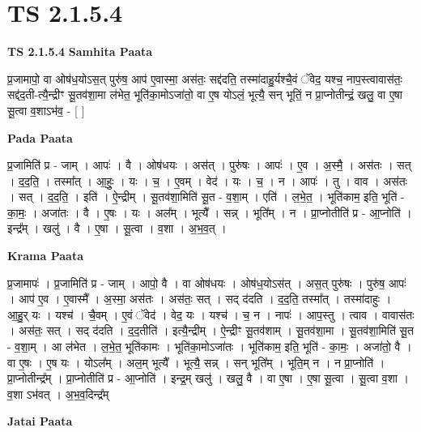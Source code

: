 \documentclass[17pt]{extarticle}
\begin{document}
\section{ TS 2.1.5.4 }

\textbf{TS 2.1.5.4 } \newline
\textbf{Samhita Paata} \newline

प्र॒जामापो॒ वा ओष॑ध॒योऽस॒त् पुरु॑ष॒ आप॑ ए॒वास्मा॒ अस॑तः॒ सद्द॑दति॒ तस्मा॑दाहु॒र्यश्चै॒वं ॅवेद॒ यश्च॒ नाप॒स्त्वावास॑तः॒ सद्द॑द॒ती-त्यै॒न्द्रीꣳ सू॒तव॑शा॒मा ल॑भेत॒ भूति॑का॒मोऽजा॑तो॒ वा ए॒ष योऽलं॒ भूत्यै॒ सन् भूतिं॒ न प्रा॒प्नोतीन्द्रं॒ खलु॒ वा ए॒षा सू॒त्वा व॒शाऽभ॑व॒ - [  ] \newline

\textbf{Pada Paata} \newline

प्र॒जामिति॑ प्र - जाम् । आपः॑ । वै । ओष॑धयः । अस॑त् । पुरु॑षः । आपः॑ । ए॒व । अ॒स्मै॒ । अस॑तः । सत् । द॒द॒ति॒ । तस्मा᳚त् । आ॒हुः॒ । यः । च॒ । ए॒वम् । वेद॑ । यः । च॒ । न । आपः॑ । तु । वाव । अस॑तः । सत् । द॒द॒ति॒ । इति॑ । ऐ॒न्द्रीम् । सू॒तव॑शा॒मिति॑ सू॒त - व॒शा॒म् । एति॑ । ल॒भे॒त॒ । भूति॑काम॒ इति॒ भूति॑ - का॒मः॒ । अजा॑तः । वै । ए॒षः । यः । अल᳚म् । भूत्यै᳚ । सन्न् । भूति᳚म् । न । प्रा॒प्नोतीति॑ प्र - आ॒प्नोति॑ । इन्द्र᳚म् । खलु॑ । वै । ए॒षा । सू॒त्वा । व॒शा । अ॒भ॒व॒त् ।  \newline


\textbf{Krama Paata} \newline

प्र॒जामापः॑ । प्र॒जामिति॑ प्र - जाम् । आपो॒ वै । वा ओष॑धयः । ओष॑ध॒योऽस॑त् । अस॒त् पुरु॑षः । पुरु॑ष॒ आपः॑ । आप॑ ए॒व । ए॒वास्मै᳚ । अ॒स्मा॒ अस॑तः । अस॑तः॒ सत् । सद् द॑दति । द॒द॒ति॒ तस्मा᳚त् । तस्मा॑दाहुः । आ॒हु॒र् यः । यश्च॑ । चै॒वम् । ए॒वं ॅवेद॑ । वेद॒ यः । यश्च॑ । च॒ न । नापः॑ । आप॒स्तु । त्वाव । वावास॑तः । अस॑तः॒ सत् । सद् द॑दति । द॒द॒तीति॑ । इत्यै॒न्द्रीम् । ऐ॒न्द्रीꣳ सू॒तव॑शाम् । सू॒तव॑शा॒मा । सू॒तव॑शा॒मिति॑ सू॒त - व॒शा॒म् । आ ल॑भेत । ल॒भे॒त॒ भूति॑कामः । भूति॑का॒मोऽजा॑तः । भूति॑काम॒ इति॒ भूति॑ - का॒मः॒ । अजा॑तो॒ वै । वा ए॒षः । ए॒ष यः । योऽल᳚म् । अल॒म् भूत्यै᳚ । भूत्यै॒ सन्न् । सन् भूति᳚म् । भूति॒म् न । न प्रा॒प्नोति॑ । प्रा॒प्नोतीन्द्र᳚म् । प्रा॒प्नोतीति॑ प्र - आ॒प्नोति॑ । इन्द्र॒म् खलु॑ । खलु॒ वै । वा ए॒षा । ए॒षा सू॒त्वा । सू॒त्वा व॒शा । व॒शा ऽभ॑वत् । अ॒भ॒व॒दिन्द्र᳚म् \newline

\textbf{Jatai Paata} \newline
\end{document}
